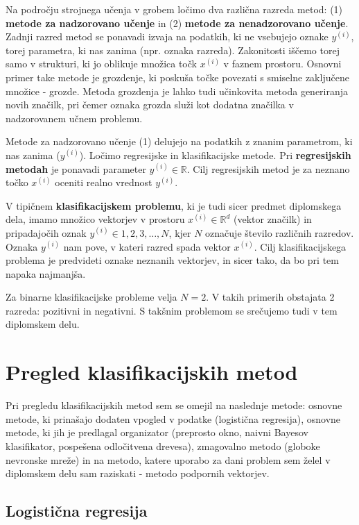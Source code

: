 \documentclass[11pt,a4paper,openany]{book}
\begin{document}
Na področju strojnega učenja v grobem ločimo dva različna razreda metod: (1) \textbf{metode za nadzorovano učenje} in (2) \textbf{metode za nenadzorovano učenje}. Zadnji razred metod se ponavadi izvaja na podatkih, ki ne vsebujejo oznake $y^{(i)}$, torej parametra, ki nas zanima (npr. oznaka razreda). Zakonitosti iščemo torej samo v strukturi, ki jo oblikuje množica točk $x^{(i)}$ v faznem prostoru. Osnovni primer take metode je grozdenje, ki poskuša točke povezati s smiselne zaključene množice - grozde. Metoda grozdenja je lahko tudi učinkovita metoda generiranja novih značilk, pri čemer oznaka grozda služi kot dodatna značilka v nadzorovanem učnem problemu.

Metode za nadzorovano učenje (1) delujejo na podatkih z znanim parametrom, ki nas zanima ($y^{(i)}$). Ločimo regresijske in klasifikacijske metode. Pri \textbf{regresijskih metodah} je ponavadi parameter $y^{(i)} \in \mathbb{R}$. Cilj regresijskih metod je za neznano točko $x^{(i)}$ oceniti realno vrednost $y^{(i)}$. 

V tipičnem \textbf{klasifikacijskem problemu}, ki je tudi sicer predmet diplomskega dela, imamo množico vektorjev v prostoru $x^{(i)} \in \mathbb{R}^d$ (vektor značilk) in pripadajočih oznak $y^{(i)} \in {1, 2, 3, \ldots, N}$, kjer $N$ označuje število različnih razredov. Oznaka $y^{(i)}$ nam pove, v kateri razred spada vektor $x^{(i)}$. Cilj klasifikacijskega problema je predvideti oznake neznanih vektorjev, in sicer tako, da bo pri tem napaka najmanjša.

Za binarne klasifikacijske probleme velja $N = 2$. V takih primerih obstajata 2 razreda: pozitivni in negativni. S takšnim problemom se srečujemo tudi v tem diplomskem delu.


\section{Pregled klasifikacijskih metod}

Pri pregledu klasifikacijskih metod sem se omejil na naslednje metode: osnovne metode, ki prinašajo dodaten vpogled v podatke (logistična regresija), osnovne metode, ki jih je predlagal organizator (preprosto okno, naivni Bayesov klasifikator, pospešena odločitvena drevesa), zmagovalno metodo (globoke nevronske mreže) in na metodo, katere uporabo za dani problem sem želel v diplomskem delu sam raziskati - metodo podpornih vektorjev. 


\subsection{Logistična regresija}
\end{document}
